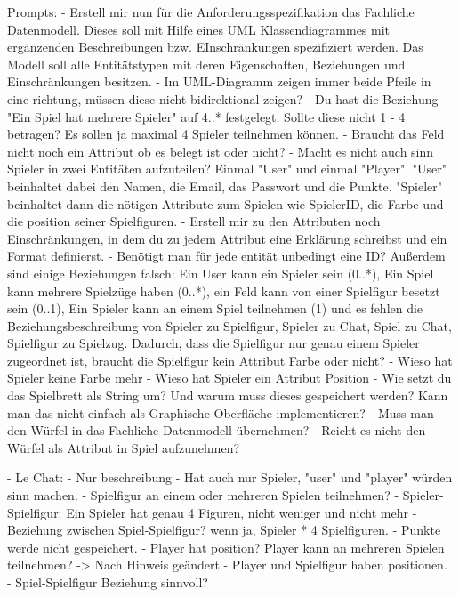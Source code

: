     Prompts:
        - Erstell mir nun für die Anforderungsspezifikation das Fachliche Datenmodell. Dieses soll mit Hilfe eines UML Klassendiagrammes mit ergänzenden Beschreibungen bzw. EInschränkungen spezifiziert werden. Das Modell soll alle Entitätstypen mit deren Eigenschaften, Beziehungen und Einschränkungen besitzen.
        - Im UML-Diagramm zeigen immer beide Pfeile in eine richtung, müssen diese nicht bidirektional zeigen?
        - Du hast die Beziehung "Ein Spiel hat mehrere Spieler" auf 4..* festgelegt. Sollte diese nicht 1 - 4 betragen? Es sollen ja maximal 4 Spieler teilnehmen können.
        - Braucht das Feld nicht noch ein Attribut ob es belegt ist oder nicht?
        - Macht es nicht auch sinn Spieler in zwei Entitäten aufzuteilen? Einmal "User" und einmal "Player".  "User" beinhaltet dabei den Namen, die Email, das Passwort und die Punkte. "Spieler" beinhaltet dann die nötigen Attribute zum Spielen wie SpielerID, die Farbe und die position seiner Spielfiguren.
        - Erstell mir zu den Attributen noch Einschränkungen, in dem du zu jedem Attribut eine Erklärung schreibst und ein Format definierst.
        - Benötigt man für jede entität unbedingt eine ID? Außerdem sind einige Beziehungen falsch: Ein User kann ein Spieler sein (0..*), Ein Spiel kann mehrere Spielzüge haben (0..*), ein Feld kann von einer Spielfigur besetzt sein (0..1), Ein Spieler kann an einem Spiel teilnehmen (1) und es fehlen die Beziehungsbeschreibung von Spieler zu Spielfigur, Spieler zu Chat, Spiel zu Chat, Spielfigur zu Spielzug. Dadurch, dass die Spielfigur nur genau einem Spieler zugeordnet ist, braucht die Spielfigur kein Attribut Farbe oder nicht?
        - Wieso hat Spieler keine Farbe mehr
        - Wieso hat Spieler ein Attribut Position
        - Wie setzt du das Spielbrett als String um? Und warum muss dieses gespeichert werden? Kann man das nicht einfach als Graphische Oberfläche implementieren?
        - Muss man den Würfel in das Fachliche Datenmodell übernehmen? 
        - Reicht es nicht den Würfel als Attribut in Spiel aufzunehmen?


- Le Chat:
    - Nur beschreibung
    - Hat auch nur Spieler, "user" und "player" würden sinn machen.
    - Spielfigur an einem oder mehreren Spielen teilnehmen?
    - Spieler-Spielfigur: Ein Spieler hat genau 4 Figuren, nicht weniger und nicht mehr
    - Beziehung zwischen Spiel-Spielfigur? wenn ja, Spieler * 4 Spielfiguren.
    - Punkte werde nicht gespeichert.
    - Player hat position? Player kann an mehreren Spielen teilnehmen? -> Nach Hinweis geändert
    - Player und Spielfigur haben positionen.
    - Spiel-Spielfigur Beziehung sinnvoll?

